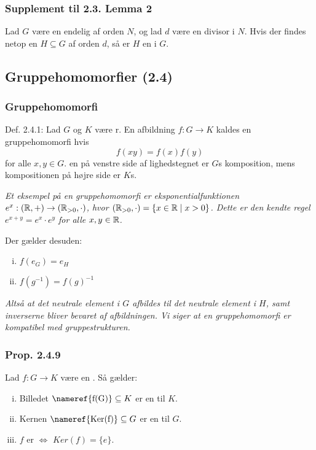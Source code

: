 \subsubsection{Supplement til 2.3. Lemma 2}
Lad $G$ være en endelig  af orden $N$, og lad $d$ være en
divisor i $N$. Hvis der findes netop en  $H \subseteq G$ af
orden $d$, så er $H$ en  i $G$.

\subsection{Gruppehomomorfier (2.4)}
\subsubsection{Gruppehomomorfi}
\label{Gruppehomomorfi}
Def. 2.4.1: Lad $G$ og $K$ være r. En afbildning $f: G
\rightarrow K$ kaldes en gruppehomomorfi hvis
\begin{equation*}
  f(xy) = f(x)f(y)
\end{equation*}
for alle $x,y \in G$. en på venstre side af lighedstegnet
er $G$s komposition, mens kompositionen på højre side er $K$s.

\textit{Et eksempel på en gruppehomomorfi er eksponentialfunktionen $e^x :
(\mathbb{R},+) \rightarrow (\mathbb{R}_{>0}, \cdot)$, hvor $(\mathbb{R}_{>0}, \cdot) = \{ x \in \mathbb{R}
\mid x > 0 \}$. Dette er den kendte regel $e^{x + y} = e^x \cdot e^y$ for alle
$x,y \in \mathbb{R}$.}

Der gælder desuden:
\begin{enumerate}[(i)]
  \item $f(e_{G}) = e_H$
  \item $f(g^{-1}) = f(g)^{-1}$
\end{enumerate}

\textit{Altså at det neutrale element i $G$ afbildes til det neutrale element i
$H$, samt inverserne bliver bevaret af afbildningen. Vi siger at en
gruppehomomorfi er kompatibel med gruppestrukturen.}

\subsubsection{Prop. 2.4.9}
\label{Prop. 2.4.9}
Lad $f: G \rightarrow K$ være en . Så gælder:
\begin{enumerate}[(i)]
  \item Billedet $\text{\nameref{f(G)}} \subseteq K$ er en 
  til $K$.
  \item Kernen $\text{\nameref{Ker(f)}} \subseteq G$ er en  til $G$.
  \item $f$ er  $\iff$ $Ker(f) = \{e\}$.
\end{enumerate}

